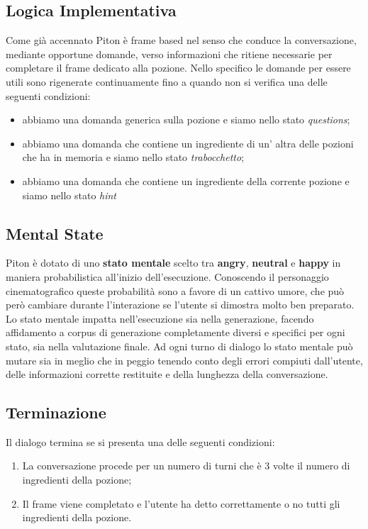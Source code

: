 \subsection{Logica Implementativa}
Come già accennato Piton è frame based nel senso che conduce la conversazione, mediante opportune domande, verso informazioni che ritiene necessarie per completare il frame dedicato alla pozione. Nello specifico le domande per essere utili sono rigenerate continuamente fino a quando non si verifica una delle seguenti condizioni:
\begin{itemize}
    \item abbiamo una domanda generica sulla pozione e siamo nello stato \textit{questions};
    \item abbiamo una domanda che contiene un ingrediente di un' altra delle pozioni che ha in memoria e siamo nello stato \textit{trabocchetto};
    \item abbiamo una domanda che contiene un ingrediente della corrente pozione e siamo nello stato \textit{hint}
\end{itemize}
\subsection{Mental State}
Piton è dotato di uno \textbf{stato mentale} scelto tra \textbf{angry}, \textbf{neutral} e \textbf{happy} in maniera probabilistica all'inizio dell'esecuzione. Conoscendo il personaggio cinematografico queste probabilità sono a favore di un cattivo umore, che può però cambiare durante l'interazione se l'utente si dimostra molto ben preparato. Lo stato mentale impatta nell'esecuzione sia nella generazione, facendo affidamento a corpus di generazione completamente diversi e specifici per ogni stato, sia nella valutazione finale. Ad ogni turno di dialogo lo stato mentale può mutare sia in meglio che in peggio tenendo conto degli errori compiuti dall'utente, delle informazioni corrette restituite e della lunghezza della conversazione. 
\subsection{Terminazione}
Il dialogo termina se si presenta una delle seguenti condizioni:
\begin{enumerate}
    \item La conversazione procede per un numero di turni che è 3 volte il numero di ingredienti della pozione;
    \item Il frame viene completato e l'utente ha detto correttamente o no tutti gli ingredienti della pozione.
\end{enumerate}

